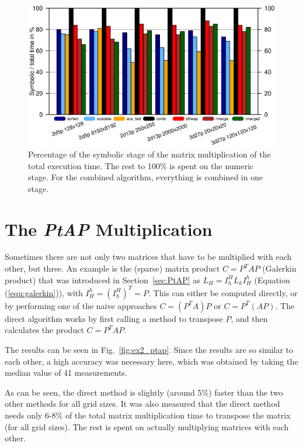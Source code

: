 \begin{figure}[tbp]
	\centering
	\includegraphics[width=1.05\textwidth, trim={0 2.cm 0 6cm},clip]{seq_symnum}
	\caption{Percentage of the symbolic stage of the matrix multiplication of the total execution time. The rest to 100\% is spent on the numeric stage. For the combined algorithm, everything is combined in one stage.} 
	\label{fig:seqsymnum}
\end{figure}


\section{The \textit{PtAP} Multiplication}
Sometimes there are not only two matrices that have to be multiplied with each other, but three. An example is the (sparse) matrix product $C = P^T A P$ (Galerkin product) that was introduced in Section~\ref{sec:PtAP} as $L_H = I_h^H L_h I_H^h$ (Equation (\ref{equ:galerkin})), with $I_H^h = (I_h^H)^T = P$. This can either be computed directly, or by performing one of the naive approaches $C = (P^T A) P$ or $C = P^T (A P)$. The direct algorithm works by first calling a method to transpose $P$, and then calculates the product $C = P^T AP$.

The results can be seen in Fig.~\ref{fig:ex2_ptap}. Since the results are so similar to each other, a high accuracy was necessary here, which was obtained by taking the median value of 41 measurements.

As can be seen, the direct method is slightly (around 5\%) faster than the two other methods for all grid sizes. It was also measured that the direct method needs only 6-8\% of the total matrix multiplication time to transpose the matrix (for all grid sizes). The rest is spent on actually multiplying matrices with each other. 

